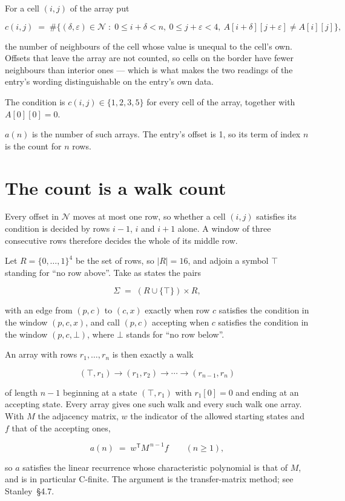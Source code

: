 \documentclass[11pt]{article}
\theoremstyle{definition}
\begin{document}
For a cell $(i,j)$ of the array put

\[c(i,j) \;=\; \#\bigl\{(\delta,\varepsilon)\in\mathcal{N} \;:\; 0\le i+\delta<n,\ 0\le j+\varepsilon<4,\ A[i+\delta][j+\varepsilon] \neq A[i][j]\bigr\},\]

the number of neighbours of the cell whose value is unequal to the cell's own. Offsets that leave the array are not counted, so cells on the border have fewer neighbours than interior ones --- which is what makes the two readings of the entry's wording distinguishable on the entry's own data.

The condition is $c(i,j) \in \{1, 2, 3, 5\}$ for every cell of the array, together with $A[0][0]=0$.

$a(n)$ is the number of such arrays. The entry's offset is 1, so its term of index $n$ is the count for $n$ rows.

\section{The count is a walk count}

Every offset in $\mathcal{N}$ moves at most one row, so whether a cell $(i,j)$ satisfies its condition is decided by rows $i-1$, $i$ and $i+1$ alone. A window of three consecutive rows therefore decides the whole of its middle row.

Let $R = \{0,\dots,1\}^{4}$ be the set of rows, so $|R| = 16$, and adjoin a symbol $\top$ standing for ``no row above''. Take as states the pairs

\[\Sigma \;=\; (R \cup \{\top\}) \times R,\]

with an edge from $(p,c)$ to $(c,x)$ exactly when row $c$ satisfies the condition in the window $(p,c,x)$, and call $(p,c)$ accepting when $c$ satisfies the condition in the window $(p,c,\bot)$, where $\bot$ stands for ``no row below''.

An array with rows $r_1,\dots,r_n$ is then exactly a walk

\[(\top,r_1) \to (r_1,r_2) \to \cdots \to (r_{n-1},r_n)\]

of length $n-1$ beginning at a state $(\top,r_1)$ with $r_1[0]=0$ and ending at an accepting state. Every array gives one such walk and every such walk one array. With $M$ the adjacency matrix, $w$ the indicator of the allowed starting states and $f$ that of the accepting ones,

\[a(n) \;=\; w^{\mathsf T} M^{\,n-1} f \qquad (n \ge 1),\]

so $a$ satisfies the linear recurrence whose characteristic polynomial is that of $M$, and is in particular C-finite. The argument is the transfer-matrix method; see Stanley~\S4.7.
\end{document}
